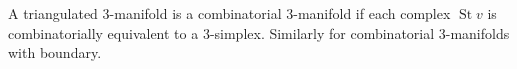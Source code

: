 A triangulated 3-manifold is a combinatorial 3-manifold if each complex $\operatorname{St} v$ is combinatorially equivalent to a 3-simplex. Similarly for combinatorial 3-manifolds with boundary.
